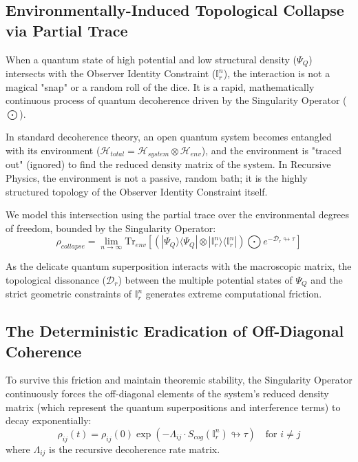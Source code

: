 \documentclass[12pt,openany]{book}
\begin{document}
\subsection{Environmentally-Induced Topological Collapse via Partial Trace}
When a quantum state of high potential and low structural density ($\Psi_Q$) intersects with the Observer Identity Constraint ($\mathbb{I}_r^n$), the interaction is not a magical "snap" or a random roll of the dice. It is a rapid, mathematically continuous process of quantum decoherence driven by the Singularity Operator ($\bigodot$).

In standard decoherence theory, an open quantum system becomes entangled with its environment ($\mathcal{H}_{total} = \mathcal{H}_{system} \otimes \mathcal{H}_{env}$), and the environment is "traced out" (ignored) to find the reduced density matrix of the system. In Recursive Physics, the environment is not a passive, random bath; it is the highly structured topology of the Observer Identity Constraint itself.

We model this intersection using the partial trace over the environmental degrees of freedom, bounded by the Singularity Operator:
\begin{equation}
    \rho_{collapse} = \lim_{n \to \infty} \text{Tr}_{env} \left[ \left( |\Psi_Q \rangle \langle \Psi_Q | \otimes |\mathbb{I}_r^n \rangle \langle \mathbb{I}_r^n | \right) \bigodot e^{-\mathcal{D}_r \looparrowright\tau} \right]
\end{equation}

As the delicate quantum superposition interacts with the macroscopic matrix, the topological dissonance ($\mathcal{D}_r$) between the multiple potential states of $\Psi_Q$ and the strict geometric constraints of $\mathbb{I}_r^n$ generates extreme computational friction. 

\subsection{The Deterministic Eradication of Off-Diagonal Coherence}
To survive this friction and maintain theoremic stability, the Singularity Operator continuously forces the off-diagonal elements of the system's reduced density matrix (which represent the quantum superpositions and interference terms) to decay exponentially:
\begin{equation}
    \rho_{ij}(t) = \rho_{ij}(0) \exp\left( - \Lambda_{ij} \cdot S_{cog}(\mathbb{I}_r^n) \looparrowright\tau \right) \quad \text{for } i \neq j
\end{equation}
where $\Lambda_{ij}$ is the recursive decoherence rate matrix. 
\end{document}
